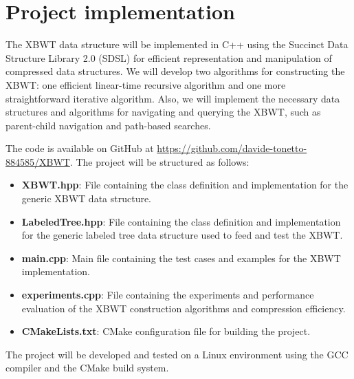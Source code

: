 \section{Project implementation}

The XBWT data structure will be implemented in C++ using the Succinct Data Structure Library 2.0 (SDSL) for efficient representation and manipulation of compressed data structures. We will develop two algorithms for constructing the XBWT: one efficient linear-time recursive algorithm and one more straightforward iterative algorithm. Also, we will implement the necessary data structures and algorithms for navigating and querying the XBWT, such as parent-child navigation and path-based searches. 

The code is available on GitHub at \url{https://github.com/davide-tonetto-884585/XBWT}. The project will be structured as follows:

\begin{itemize}
    \item \textbf{XBWT.hpp}: File containing the class definition and implementation for the generic XBWT data structure.
    \item \textbf{LabeledTree.hpp}: File containing the class definition and implementation for the generic labeled tree data structure used to feed and test the XBWT.
    \item \textbf{main.cpp}: Main file containing the test cases and examples for the XBWT implementation.
    \item \textbf{experiments.cpp}: File containing the experiments and performance evaluation of the XBWT construction algorithms and compression efficiency.
    \item \textbf{CMakeLists.txt}: CMake configuration file for building the project.
\end{itemize}

The project will be developed and tested on a Linux environment using the GCC compiler and the CMake build system. 
